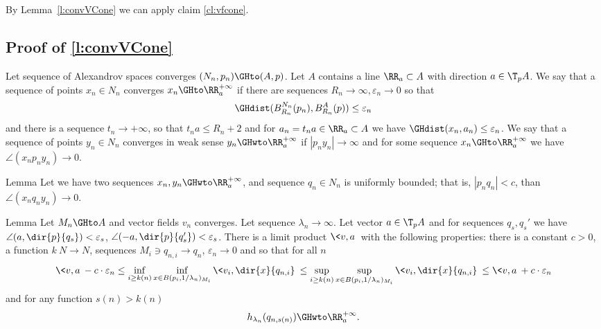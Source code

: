 By Lemma~\ref{l:convVCone} we can apply claim \ref{cl:vfcone}.
\qeds




\subsection{Proof of \ref{l:convVCone}}

Let sequence of Alexandrov spaces converges
$(N_n,p_n)\GHto (A,p)$.
 Let $A$ contains a line $\RR_a\subset A$
 with direction
$a\in \T_p A$.
We say that a sequence of points  $x_n\in N_n$
converges $x_n\GHto\RR_a^{+\infty}$ if
there are sequences $R_n\to\infty,\varepsilon_n\to 0$
so that
$$\GHdist(B^{N_n}_{R_n}(p_n), B^{A}_{R_n}(p))\le\varepsilon_n$$
and there is a sequence $t_n\to+\infty$,
so that
$t_n a\le R_n+2$ and
 for $a_n=t_n a\in \RR_a\subset A$
we have
$\GHdist(x_n,a_n)\le\varepsilon_n$.
We say that a sequence of points  $y_n\in N_n$
converges in weak sense $y_n\GHwto\RR_a^{+\infty}$ if
$|p_n y_n|\to \infty$ and
for some sequence
$x_n\GHto\RR_a^{+\infty}$ we have $\angle (x_n p_n y_n)\to 0$.

\begin{thm}{Lemma}\label{lem:angle}
Let we have two sequences $x_n, y_n\GHwto\RR_a^{+\infty}$,
and  sequence $q_n\in N_n$ is uniformly bounded; that is, $|p_n q_n|<c$,
than $\angle (x_n q_n y_n)\to 0$.
\end{thm}




\begin{thm}{Lemma} \label{lem:vconvergLoc}
Let $M_n\GHto A$ and vector fields $v_n$ converges.
Let sequence $\lambda_n\to\infty$.
Let vector $a\in \T_p A$
and for sequences $q_s, q_s'$
we have $\angle (a,\dir{p}{q_s})<\varepsilon_s$,
 $\angle (-a,\dir{p}{q'_s})<\varepsilon_s$.
There is a  limit product $\<v,a\>$
with the following properties:
there is a constant $c>0$,
a function $k\: N\to N$,
 sequences
$M_i\ni q_{n,i}\to q_n$, $\varepsilon_n\to 0$
and
so that for   all $n$
$$\<v,a\>- c\cdot \varepsilon_n
\le
\inf_{i\ge k(n)}\inf_{x\in B(p_i,1/\lambda_n)_{M_i}} \< v_i,\dir{x}{q_{n,i}}\>
\le
\sup_{i\ge k(n)}\sup_{x\in B(p_i,1/\lambda_n)_{M_i}}  \< v_i,\dir{x}{q_{n,i}}\>\le
\<v,a\>+
 c\cdot \varepsilon_n$$
and for any function $s(n)>k(n)$
$$h_{\lambda_n}( q_{n,s(n)})\GHwto\RR_a^{+\infty}.$$

\end{thm}

